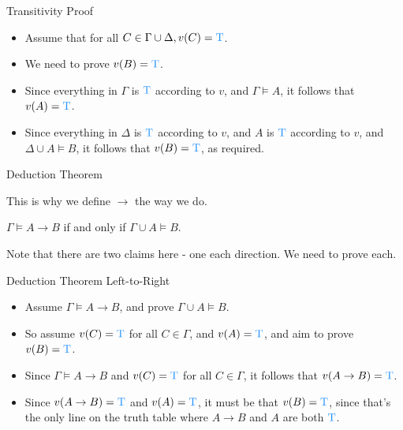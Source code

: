 \documentclass[
  ignorenonframetext,
]{beamer}
\providecommand{\tightlist}{%
  \setlength{\itemsep}{0pt}\setlength{\parskip}{0pt}}
\renewcommand{\,}{\text{, }}
\renewenvironment*{quote}	
	{\list{}{\rightmargin   \leftmargin} \item } 	
	{\endlist }
\def\True{\textcolor{dodgerblue}{\text{T}}}
\begin{document}
\begin{frame}{Transitivity Proof}
\protect\hypertarget{transitivity-proof}{}

\begin{itemize}
\tightlist
\item
  Assume that for all \(C \in \Gamma \cup \Delta, v(C) = \True\).
\item
  We need to prove \(v(B) = \True\).\pause
\item
  Since everything in \(\Gamma\) is \(\True\) according to \(v\), and
  \(\Gamma \vDash A\), it follows that \(v(A) = \True\).\pause
\item
  Since everything in \(\Delta\) is \(\True\) according to \(v\), and
  \(A\) is \(\True\) according to \(v\), and \(\Delta \cup A \vDash B\),
  it follows that \(v(B) = \True\), as required.
\end{itemize}

\end{frame}

\begin{frame}{Deduction Theorem}
\protect\hypertarget{deduction-theorem}{}

This is why we define \(\rightarrow\) the way we do.

\begin{quote}
\(\Gamma \vDash A \rightarrow B\) if and only if
\(\Gamma \cup A \vDash B\).
\end{quote}

Note that there are two claims here - one each direction. We need to
prove each.

\end{frame}

\begin{frame}{Deduction Theorem Left-to-Right}
\protect\hypertarget{deduction-theorem-left-to-right}{}

\begin{itemize}
\tightlist
\item
  Assume \(\Gamma \vDash A \rightarrow B\), and prove
  \(\Gamma \cup A \vDash B\).
\item
  So assume \(v(C) = \True\) for all \(C \in \Gamma\), and
  \(v(A) = \True\), and aim to prove \(v(B) = \True\).\pause
\item
  Since \(\Gamma \vDash A \rightarrow B\) and \(v(C) = \True\) for all
  \(C \in \Gamma\), it follows that
  \(v(A \rightarrow B) = \True\).\pause
\item
  Since \(v(A \rightarrow B) = \True\) and \(v(A) = \True\), it must be
  that \(v(B) = \True\), since that's the only line on the truth table
  where \(A \rightarrow B\) and \(A\) are both \(\True\).
\end{itemize}

\end{frame}
\end{document}
